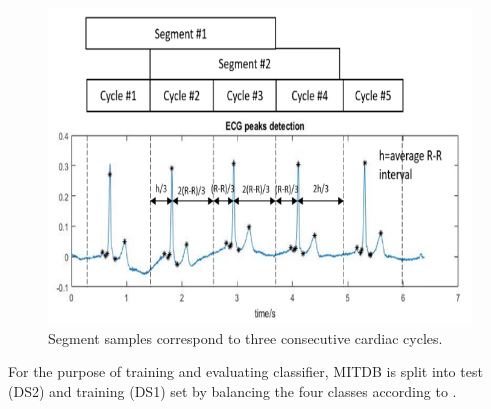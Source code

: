 \begin{figure}[t]
	\centering
	\includegraphics[scale=.8]{Fig/segment.png}
	\caption{Segment samples correspond to three consecutive cardiac cycles.}
	\label{fig:interval}
\end{figure}


For the purpose of training and evaluating classifier, MITDB is split into test (DS2) and training (DS1) set by balancing the four classes according to \cite{autofs}.


